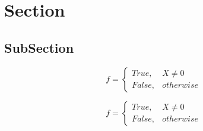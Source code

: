 \documentclass[a4paper]{article}
\begin{document}
\section{Section}

\subsection{SubSection}

\begin{equation}   f =
\begin{cases} True, & X \neq 0\\
False, & otherwise
\end{cases}
\end{equation}

\begin{equation}   f =
\begin{cases} True, & X \neq 0\\
False, & otherwise
\end{cases}
\end{equation}
\end{document}
